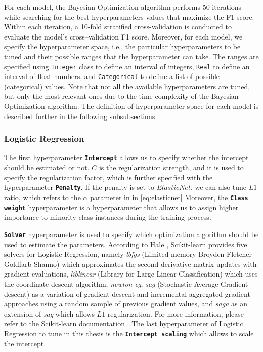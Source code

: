 For each model, the Bayesian Optimization algorithm performs 50 iterations while searching for the best hyperparameters values that maximize the F1 score. Within each iteration, a 10-fold stratified cross-validation is conducted to evaluate the model's cross--validation F1 score.
Moreover, for each model, we specify the hyperparameter space, i.e., the particular hyperparameters to be tuned and their possible ranges that the hyperparameter can take. The ranges are specified using \lstinline{Integer} class to define an interval of integers, \lstinline{Real} to define an interval of float numbers, and \lstinline{Categorical} to define a list of possible (categorical) values.
Note that not all the available hyperparameters are tuned, but only the most relevant ones due to the time complexity of the Bayesian Optimization algorithm.
The definition of hyperparameter space for each model is described further in the following subsubsections.

\subsubsection{Logistic Regression}
The first hyperparameter \textbf{\texttt{Intercept}} allows us to specify whether the intercept should be estimated or not.
$C$ is the regularization strength, and it is used to specify the regularization factor, which is further specified with the hyperparameter \textbf{\texttt{Penalty}}.
If the penalty is set to $ElasticNet$, we can also tune $L1$ ratio, which refers to the $\alpha$ parameter in in \autoref{eq:elasticnet}
Moreover, the \textbf{\texttt{Class weight}} hyperparameter is a hyperparameter that allows us to assign higher importance to minority class instances during the training process.


\textbf{\texttt{Solver}} hyperparameter is used to specify which optimization algorithm should be used to estimate the parameters.
According to Hale \citep{hale2019dont}, Scikit-learn provides five solvers for Logistic Regression, namely \textit{lbfgs} (Limited-memory Broyden-Fletcher-Goldfarb-Shanno) which approximates the second derivative matrix updates with gradient evaluations, \textit{liblinear} (Library for Large Linear Classification) which uses the coordinate descent algorithm, \textit{newton-cg},
\textit{sag} (Stochastic Average Gradient descent) as a variation of gradient descent and incremental aggregated gradient approaches using a random sample of previous gradient values, and \textit{saga} as an extension of \textit{sag} which allows $L1$ regularization.
For more information, please refer to the Scikit-learn documentation \citep{scikit-lr}.
The last hyperparameter of Logistic Regression to tune in this thesis is the \textbf{\texttt{Intercept scaling}} which allows to scale the intercept.

